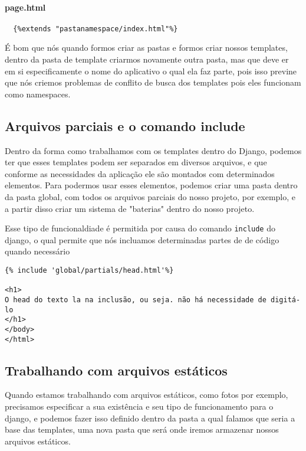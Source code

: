 \documentclass[12pt, a4paper]{paper}
\begin{document}
\paragraph{page.html} %
\label{par:page.html}


\begin{verbatim}
  {%extends "pastanamespace/index.html"%}

\end{verbatim}

É bom que nós quando formos criar as pastas e formos criar nossos templates, dentro da 
pasta de template criarmos novamente outra pasta, mas que deve er em si especificamente 
o nome do aplicativo o qual ela faz parte, pois isso previne que nós criemos problemas 
de conflito de busca dos templates pois eles funcionam como namespaces.

\subsection{Arquivos parciais e o comando include} %
\label{sub:Arquivos parciais e o comando include}
Dentro da forma como trabalhamos com os templates dentro do Django, podemos ter que 
esses templates podem ser separados em diversos arquivos, e que conforme as 
necessidades da aplicação ele são montados com determinados elementos. Para podermos
usar esses elementos, podemos criar uma pasta dentro da pasta global, com todos os 
arquivos parciais do nosso projeto, por exemplo, e a partir disso criar um sistema de 
"baterias" dentro do nosso projeto. 

Esse tipo de funcionaldiade é permitida por causa do comando \texttt{include} do django,
o qual permite que nós incluamos determinadas partes de de código quando necessário 


\begin{verbatim}
{% include 'global/partials/head.html'%}

<h1>
O head do texto la na inclusão, ou seja. não há necessidade de digitá-lo
</h1>
</body>
</html>
\end{verbatim}

\subsection{Trabalhando com arquivos estáticos} %
\label{sub:Trabalhando com arquivos estáticos}
Quando estamos trabalhando com arquivos estáticos, como fotos por exemplo, precisamos 
especificar a sua existência e seu tipo de funcionamento para o django, e podemos fazer 
isso definido dentro da pasta a qual falamos que seria a base das templates, uma nova 
pasta que será onde iremos armazenar nossos arquivos estáticos.
\end{document}
